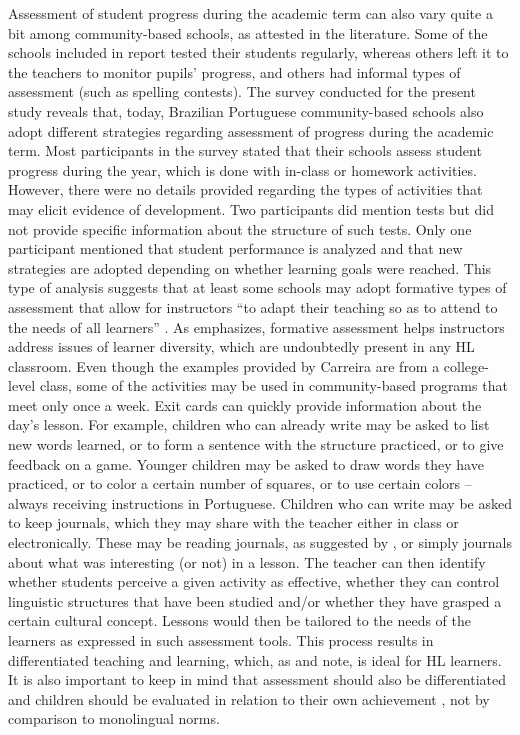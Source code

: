 \documentclass[output=paper]{langscibook}
\begin{document}
  Assessment of student progress during the academic term can also vary quite a bit among community-based schools, as attested in the literature. Some of the schools included in  report tested their students regularly, whereas others left it to the teachers to monitor pupils’ progress, and others had informal types of assessment (such as spelling contests). The survey conducted for the present study reveals that, today, Brazilian Portuguese community-based schools also adopt different strategies regarding assessment of progress during the academic term. Most participants in the survey stated that their schools assess student progress during the year, which is done with in-class or homework activities. However, there were no details provided regarding the types of activities that may elicit evidence of development. Two participants did mention tests but did not provide specific information about the structure of such tests. Only one participant mentioned that student performance is analyzed and that new strategies are adopted depending on whether learning goals were reached. This type of analysis suggests that at least some schools may adopt formative types of assessment that allow for instructors “to adapt their teaching so as to attend to the needs of all learners” \citep[115]{Carreira2012a}. As \citet{Carreira2012a} emphasizes, formative assessment helps instructors address issues of learner diversity, which are undoubtedly present in any HL classroom. Even though the examples provided by Carreira are from a college-level class, some of the activities may be used in community-based programs that meet only once a week. Exit cards can quickly provide information about the day’s lesson. For example, children who can already write may be asked to list new words learned, or to form a sentence with the structure practiced, or to give feedback on a game. Younger children may be asked to draw words they have practiced, or to color a certain number of squares, or to use certain colors -- always receiving instructions in Portuguese. Children who can write may be asked to keep journals, which they may share with the teacher either in class or electronically. These may be reading journals, as suggested by \citet{Carreira2012a}, or simply journals about what was interesting (or not) in a lesson. The teacher can then identify whether students perceive a given activity as effective, whether they can control linguistic structures that have been studied and/or whether they have grasped a certain cultural concept. Lessons would then be tailored to the needs of the learners as expressed in such assessment tools. This process results in differentiated teaching and learning, which, as \citet{Carreira2012a} and \citet{Beaudrie2016} note, is ideal for HL learners. It is also important to keep in mind that assessment should also be differentiated and children should be evaluated in relation to their own achievement \citep{Douglas2005}, not by comparison to monolingual norms.
\end{document}
